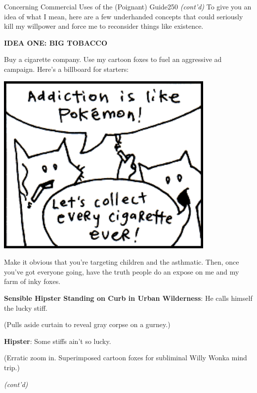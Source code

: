 \documentclass[10pt,twoside]{report}
\begin{document}
	\begin{sidebar}{Concerning Commercial Uses of the (Poignant) Guide}{250}
		\textit{(cont'd) }To give you an idea of what I mean, here are a few underhanded concepts that could seriously kill my willpower and force me to reconsider things like existence.\vspace{6pt}
		
		\textbf{IDEA ONE: BIG TOBACCO}\vspace{6pt}
		
		Buy a cigarette company. Use my cartoon foxes to fuel an aggressive ad campaign. Here's a billboard for starters:\vspace{6pt}
	
		\hfill
		\includegraphics[width=0.8\textwidth]{cache/sidebar311.png}
		\hspace*{\fill}
		
		Make it obvious that you're targeting children and the asthmatic. Then, once you've got everyone going, have the truth people do an expose on me and my farm of inky foxes.\vspace{6pt}
		
		\begin{quoting}[rightmargin=0pt,leftmargin=0.5\leftmargin,font=itshape]
			\textbf{Sensible Hipster Standing on Curb in Urban Wilderness}: He calls himself the lucky stiff.\vspace{4pt}
			
			{\scriptsize (Pulls aside curtain to reveal gray corpse on a gurney.)}\vspace{4pt}
			
			\textbf{Hipster}: Some stiffs ain't so lucky.\vspace{4pt}
			
			{\scriptsize (Erratic zoom in. Superimposed cartoon foxes for subliminal Willy Wonka mind trip.) }
		\end{quoting}
		
		\hfill\textit{(cont'd)}
	\end{sidebar}
\end{document}
